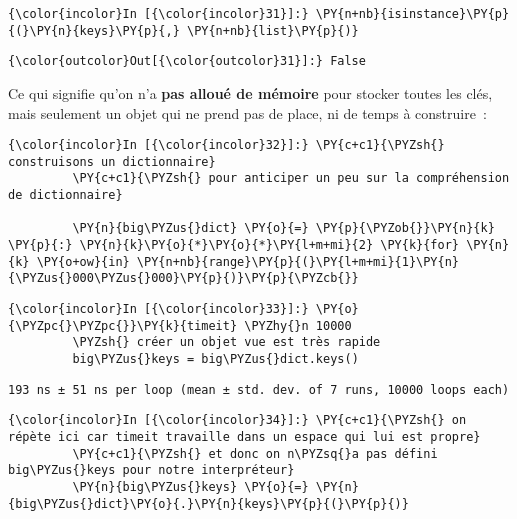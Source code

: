     \begin{Verbatim}[commandchars=\\\{\}]
{\color{incolor}In [{\color{incolor}31}]:} \PY{n+nb}{isinstance}\PY{p}{(}\PY{n}{keys}\PY{p}{,} \PY{n+nb}{list}\PY{p}{)}
\end{Verbatim}


\begin{Verbatim}[commandchars=\\\{\}]
{\color{outcolor}Out[{\color{outcolor}31}]:} False
\end{Verbatim}
            
    Ce qui signifie qu'on n'a \textbf{pas alloué de mémoire} pour stocker
toutes les clés, mais seulement un objet qui ne prend pas de place, ni
de temps à construire~:

    \begin{Verbatim}[commandchars=\\\{\}]
{\color{incolor}In [{\color{incolor}32}]:} \PY{c+c1}{\PYZsh{} construisons un dictionnaire}
         \PY{c+c1}{\PYZsh{} pour anticiper un peu sur la compréhension de dictionnaire}
         
         \PY{n}{big\PYZus{}dict} \PY{o}{=} \PY{p}{\PYZob{}}\PY{n}{k} \PY{p}{:} \PY{n}{k}\PY{o}{*}\PY{o}{*}\PY{l+m+mi}{2} \PY{k}{for} \PY{n}{k} \PY{o+ow}{in} \PY{n+nb}{range}\PY{p}{(}\PY{l+m+mi}{1}\PY{n}{\PYZus{}000\PYZus{}000}\PY{p}{)}\PY{p}{\PYZcb{}}
\end{Verbatim}


    \begin{Verbatim}[commandchars=\\\{\}]
{\color{incolor}In [{\color{incolor}33}]:} \PY{o}{\PYZpc{}\PYZpc{}}\PY{k}{timeit} \PYZhy{}n 10000
         \PYZsh{} créer un objet vue est très rapide
         big\PYZus{}keys = big\PYZus{}dict.keys()
\end{Verbatim}


    \begin{Verbatim}[commandchars=\\\{\}]
193 ns ± 51 ns per loop (mean ± std. dev. of 7 runs, 10000 loops each)

    \end{Verbatim}

    \begin{Verbatim}[commandchars=\\\{\}]
{\color{incolor}In [{\color{incolor}34}]:} \PY{c+c1}{\PYZsh{} on répète ici car timeit travaille dans un espace qui lui est propre}
         \PY{c+c1}{\PYZsh{} et donc on n\PYZsq{}a pas défini big\PYZus{}keys pour notre interpréteur}
         \PY{n}{big\PYZus{}keys} \PY{o}{=} \PY{n}{big\PYZus{}dict}\PY{o}{.}\PY{n}{keys}\PY{p}{(}\PY{p}{)}
\end{Verbatim}


